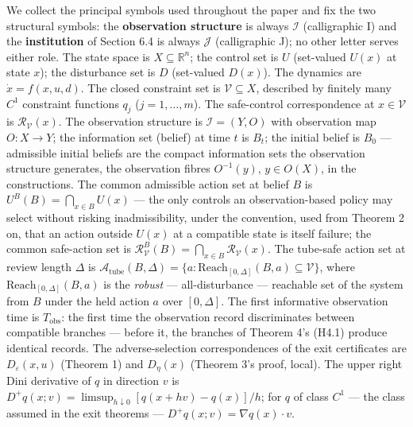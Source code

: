 \documentclass[11pt]{article}
\begin{document}
We collect the principal symbols used throughout the paper and fix the two structural symbols: the \textbf{observation structure} is always
\(\mathcal{I}\) (calligraphic I) and the \textbf{institution} of Section
6.4 is always \(\mathcal{J}\) (calligraphic J); no other letter serves either role. The state space is \(X \subseteq \mathbb{R}^n\); the
control set is \(U\) (set-valued \(U(x)\) at state \(x\)); the
disturbance set is \(D\) (set-valued \(D(x)\)). The dynamics are
\(\dot x = f(x,u,d)\). The closed constraint set is
\(\mathcal{V} \subseteq X\), described by finitely many \(C^1\)
constraint functions \(q_j\) (\(j = 1,\ldots,m\)). The safe-control
correspondence at \(x \in \mathcal{V}\) is
\(\mathcal{R}_{\mathcal{V}}(x)\). The observation structure is
\(\mathcal{I} = (Y, O)\) with observation map \(O : X \to Y\); the
information set (belief) at time \(t\) is \(B_t\); the initial belief is
\(B_0\) --- admissible initial beliefs are the compact information sets
the observation structure generates, the observation fibres
\(O^{-1}(y)\), \(y \in O(X)\), in the constructions. The common
admissible action set at belief \(B\) is
\(U^B(B) = \bigcap_{x \in B} U(x)\) --- the only controls an
observation-based policy may select without risking inadmissibility,
under the convention, used from Theorem 2 on, that an action outside
\(U(x)\) at a compatible state is itself failure; the common safe-action
set is
\(\mathcal{R}_{\mathcal{V}}^B(B) = \bigcap_{x \in B} \mathcal{R}_{\mathcal{V}}(x)\).
The tube-safe action set at review length \(\Delta\) is
\(\mathcal{A}_{\mathrm{tube}}(B, \Delta) = \{ a : \mathrm{Reach}_{[0,\Delta]}(B, a) \subseteq \mathcal{V} \}\),
where \(\mathrm{Reach}_{[0,\Delta]}(B, a)\) is the \emph{robust} ---
all-disturbance --- reachable set of the system from \(B\) under the
held action \(a\) over \([0,\Delta]\). The first informative observation
time is \(T_{\mathrm{obs}}\): the first time the observation record
discriminates between compatible branches --- before it, the branches of
Theorem 4's (H4.1) produce identical records. The adverse-selection
correspondences of the exit certificates are \(D_{\varepsilon}(x, u)\)
(Theorem 1) and \(D_{\eta}(x)\) (Theorem 3's proof, local). The upper
right Dini derivative of \(q\) in direction \(v\) is
\(D^+ q(x; v) = \limsup_{h \downarrow 0} [q(x + hv) - q(x)]/h\); for
\(q\) of class \(C^1\) --- the class assumed in the exit theorems ---
\(D^+ q(x; v) = \nabla q(x) \cdot v\).
\end{document}
